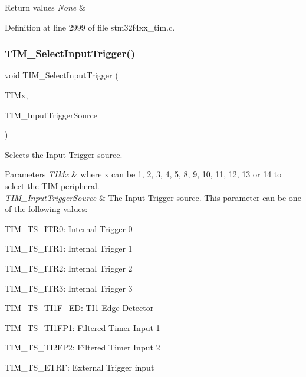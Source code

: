 \begin{DoxyRetVals}{Return values}
{\em None} & \\
\hline
\end{DoxyRetVals}


Definition at line 2999 of file stm32f4xx\+\_\+tim.\+c.

\mbox{\label{group___t_i_m___group7_ga4252583c6ae8a73d6fc66f7e951dbc35}} 
\subsubsection{\texorpdfstring{T\+I\+M\+\_\+\+Select\+Input\+Trigger()}{TIM\_SelectInputTrigger()}}
{\footnotesize\ttfamily void T\+I\+M\+\_\+\+Select\+Input\+Trigger (\begin{DoxyParamCaption}\item[{\hyperlink{struct_t_i_m___type_def}{T\+I\+M\+\_\+\+Type\+Def} $\ast$}]{T\+I\+Mx,  }\item[{uint16\+\_\+t}]{T\+I\+M\+\_\+\+Input\+Trigger\+Source }\end{DoxyParamCaption})}



Selects the Input Trigger source. 


\begin{DoxyParams}{Parameters}
{\em T\+I\+Mx} & where x can be 1, 2, 3, 4, 5, 8, 9, 10, 11, 12, 13 or 14 to select the T\+IM peripheral. \\
\hline
{\em T\+I\+M\+\_\+\+Input\+Trigger\+Source} & The Input Trigger source. This parameter can be one of the following values\+: \begin{DoxyItemize}
\item T\+I\+M\+\_\+\+T\+S\+\_\+\+I\+T\+R0\+: Internal Trigger 0 \item T\+I\+M\+\_\+\+T\+S\+\_\+\+I\+T\+R1\+: Internal Trigger 1 \item T\+I\+M\+\_\+\+T\+S\+\_\+\+I\+T\+R2\+: Internal Trigger 2 \item T\+I\+M\+\_\+\+T\+S\+\_\+\+I\+T\+R3\+: Internal Trigger 3 \item T\+I\+M\+\_\+\+T\+S\+\_\+\+T\+I1\+F\+\_\+\+ED\+: T\+I1 Edge Detector \item T\+I\+M\+\_\+\+T\+S\+\_\+\+T\+I1\+F\+P1\+: Filtered Timer Input 1 \item T\+I\+M\+\_\+\+T\+S\+\_\+\+T\+I2\+F\+P2\+: Filtered Timer Input 2 \item T\+I\+M\+\_\+\+T\+S\+\_\+\+E\+T\+RF\+: External Trigger input \end{DoxyItemize}
\\
\hline
\end{DoxyParams}

